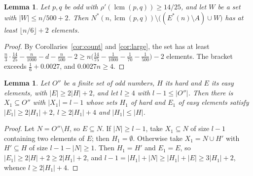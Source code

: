 \documentclass[11pt,a4paper]{article}
\newtheorem{lemma}[theorem]{Lemma}
\theoremstyle{definition}
\theoremstyle{remark}
\DeclareMathOperator{\lcm}{lcm}
\newcommand{\Es}{E^{*}}
\begin{document}
\begin{lemma}\label{lem:degree}
Let $p,q$ be odd with $\rho'(\lcm(p,q))\ge14/25$, and let $W$ be a set with $|W|\le n/500+2$. Then
$N^*(n,\lcm(p,q))\setminus\big((\Es(n)\setminus A)\cup W\big)$ has at least $\lfloor n/6\rfloor+2$
elements.
\end{lemma}

\begin{proof}
By Corollaries~\ref{cor:count} and \ref{cor:large}, the set has at least
$\frac n3\cdot\frac{14}{25}-\frac n{1000}-d-\frac n{500}-2\ge n\big(\frac{14}{75}-\frac1{1000}-
\frac1{70}-\frac1{500}\big)-2$ elements. The bracket exceeds $\frac16+0.0027$, and $0.0027n\ge4$.
\end{proof}

\begin{lemma}\label{lem:choose}
Let $O''$ be a finite set of odd numbers, $H$ its hard and $E$ its easy elements, with $|E|\ge2|H|+2$,
and let $l\ge4$ with $l-1\le|O''|$. Then there is $X_1\subseteq O''$ with $|X_1|=l-1$ whose sets $H_1$
of hard and $E_1$ of easy elements satisfy $|E_1|\ge2|H_1|+2$, $l\ge2|H_1|+4$ and $|H_1|\le|H|$.
\end{lemma}

\begin{proof}
Let $N=O''\setminus H$, so $E\subseteq N$. If $|N|\ge l-1$, take $X_1\subseteq N$ of size $l-1$
containing two elements of $E$; then $H_1=\emptyset$. Otherwise take $X_1=N\cup H'$ with $H'\subseteq
H$ of size $l-1-|N|\ge1$. Then $H_1=H'$ and $E_1=E$, so $|E_1|\ge2|H|+2\ge2|H_1|+2$, and
$l-1=|H_1|+|N|\ge|H_1|+|E|\ge3|H_1|+2$, whence $l\ge2|H_1|+4$.
\end{proof}
\end{document}
